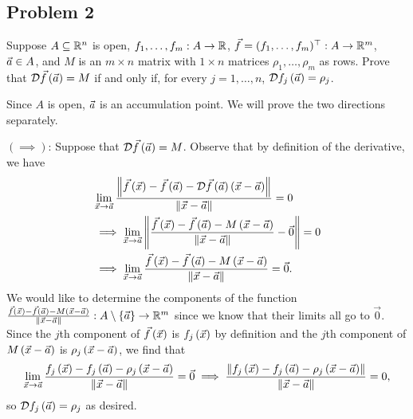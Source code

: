 \documentclass[main.tex]{subfiles}
\begin{document}
\subsection{Problem 2}
\begin{claim}
    Suppose $A \subseteq \mathbb R^n$ is open, $f_1, \ldots ,f_m : A \to \mathbb R$, $\vec{f} = (f_1,\ldots ,f_m)^\top : A \to \mathbb R^m$, $\vec{a} \in A$, and $M$ is an $m\times n$ matrix with $1\times n$ matrices $\rho_1,\ldots ,\rho_m$ as rows. Prove that $\mathcal{D}\vec{f}\left( \vec{a} \right) = M$ if and only if, for every $j = 1,\ldots ,n$, $\mathcal{D}f_j \left( \vec{a} \right) = \rho_j$.
\end{claim}

\begin{soln}
    Since $A$ is open, $\vec{a}$ is an accumulation point. We will prove the two directions separately.

    $(\implies)$: Suppose that $\mathcal{D}\vec{f}\left( \vec{a} \right) = M$. Observe that by definition of the derivative, we have
    \begin{align*}
        &\lim_{\vec{x}\to \vec{a}} \frac{\left\lVert \vec{f}\left( \vec{x} \right) - \vec{f}\left( \vec{a} \right) - \mathcal{D}\vec{f}\left( \vec{a} \right)\left( \vec{x} - \vec{a} \right) \right\rVert}{\left\lVert \vec{x} - \vec{a} \right\rVert} = 0 \\
        &\implies\lim_{\vec{x}\to \vec{a}} \left\lVert \frac{\vec{f}\left( \vec{x} \right) - \vec{f}\left( \vec{a} \right) - M\left( \vec{x} - \vec{a} \right)}{\left\lVert \vec{x} - \vec{a} \right\rVert} - \vec{0} \right\rVert = 0 \\
        &\implies \lim_{\vec{x}\to \vec{a}} \frac{\vec{f}\left( \vec{x} \right) - \vec{f}\left( \vec{a} \right) - M\left( \vec{x} - \vec{a} \right)}{\left\lVert \vec{x} - \vec{a} \right\rVert} = \vec{0}.
    \end{align*}
    We would like to determine the components of the function $\frac{\vec{f}\left( \vec{x} \right) - \vec{f}\left( \vec{a} \right) - M\left( \vec{x} - \vec{a} \right)}{\left\lVert \vec{x} - \vec{a} \right\rVert} : A\setminus\left\{ \vec{a} \right\} \to \mathbb R^m$ since we know that their limits all go to $\vec{0}$. Since the $j$th component of $\vec{f}\left( \vec{x} \right)$ is $f_j\left( \vec{x} \right)$ by definition and the $j$th component of $M\left( \vec{x} - \vec{a} \right)$ is $\rho_j\left( \vec{x} - \vec{a} \right)$, we find that
    \[\lim_{\vec{x}\to \vec{a}} \frac{f_j\left( \vec{x} \right) - f_j\left( \vec{a} \right) - \rho_j\left( \vec{x} - \vec{a} \right)}{\left\lVert \vec{x} - \vec{a} \right\rVert} = \vec{0}\implies \frac{\left\lVert f_j\left( \vec{x} \right) - f_j\left( \vec{a} \right) - \rho_j\left( \vec{x} - \vec{a} \right) \right\rVert}{\left\lVert \vec{x} - \vec{a} \right\rVert} = 0,\]
    so $\mathcal{D}f_j\left( \vec{a} \right) = \rho_j$ as desired.


\end{soln}
\end{document}
